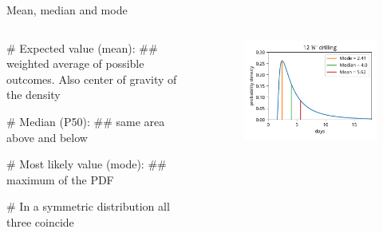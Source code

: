 \documentclass[12pt, aspectratio=149]{beamer}
\theoremstyle{plain}
\begin{document}
\begin{frame}[fragile]{Mean, median and mode}
	\begin{columns}
		\begin{column}{0.5\textwidth}
			\begin{easylist}[itemize]
			# Expected value (mean): 
			## weighted average of possible outcomes. Also
			center of gravity of the density

			# Median (P50): 
			## same area above and below
	
			# Most likely value (mode): 
			## maximum of the PDF

			# In a symmetric distribution all three coincide
			\end{easylist}
		\end{column}
		\begin{column}{0.5\textwidth}
			\begin{figure}
				\includegraphics[width=0.99\linewidth]{figures/lognorm_pdf}
			\end{figure}
		\end{column}
	\end{columns}
	\end{frame}
	
\end{document}
